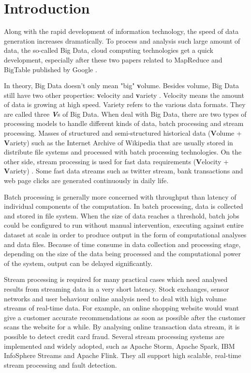 \chapter{Introduction}
\label{chapter:intro}

Along with the rapid development of information technology, the speed of data generation increases dramatically. To process and analysis such large amount of data, the so-called Big Data, cloud computing technologies get a quick development, especially after these two papers related to MapReduce and BigTable published by Google \cite{chang2006bigtable, dean2008mapreduce}.

In theory, Big Data doesn't only mean "big" \textbf{v}olume. Besides volume, Big Data still have two other properties: \textbf{v}elocity and \textbf{v}ariety \cite{doug2001data}. Velocity means the amount of data is growing at high speed. Variety refers to the various data formats. They are called three \textbf{\textit{V}}s of Big Data.  When deal with Big Data, there are two types of processing models to handle different kinds of data, batch processing and stream processing. Masses of structured and semi-structured historical data (\textbf{V}olume + \textbf{V}ariety) such as the Internet Archive of Wikipedia that are usually stored in distribute file systems and processed with batch processing technologies. On the other side, stream processing is used for fast data requirements (\textbf{V}elocity + \textbf{V}ariety) \cite{GameChanger}. Some fast data streams such as twitter stream, bank transactions and web page clicks are generated continuously in daily life.

Batch processing is generally more concerned with throughput than latency of individual components of the computation. In batch processing, data is collected and stored in file system. When the size of data reaches a threshold, batch jobs could be configured to run without manual intervention, executing against entire dataset at scale in order to produce output in the form of computational analyses and data files. Because of time consume in data collection and processing stage, depending on the size of the data being processed and the computational power of the system, output can be delayed significantly.

Stream processing is required for many practical cases which need analysed results from streaming data in a very short latency. Stock exchanges, sensor networks and user behaviour online analysis need to deal with high volume streams of real-time data. For example, an online shopping website would want give a customer accurate recommendations as soon as possible after the customer scans the website for a while. By analysing online transaction data stream, it is possible to detect credit card fraud. Several stream processing systems are implemented and widely adopted, such as Apache Storm, Apache Spark, IBM InfoSphere Streams and Apache Flink. They all support high scalable, real-time stream processing and fault detection. 

